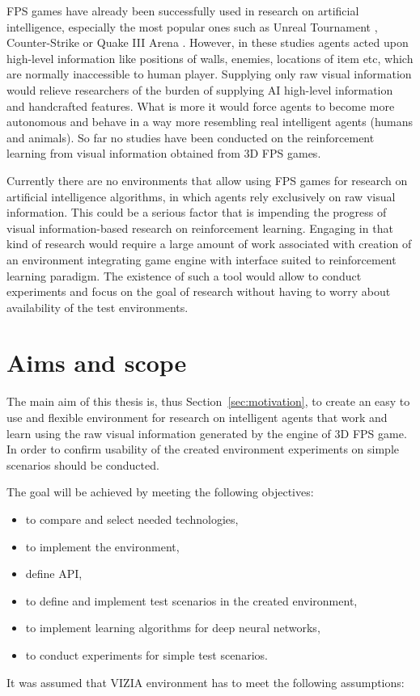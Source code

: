 FPS games have already been successfully used in research on artificial intelligence, especially the most popular ones such as Unreal Tournament \cite{6314567} \cite{6922494}, Counter-Strike \cite{5035619} or Quake III Arena \cite{el2007hybrid}.
However, in these studies agents acted upon high-level information like positions of walls, enemies, locations of item etc, which are normally inaccessible to human player.
Supplying only raw visual information would relieve researchers of the burden of supplying AI high-level information and handcrafted features.
What is more it would force agents to become more autonomous and behave in a way more resembling real intelligent agents (humans and animals).
So far no studies have been conducted on the reinforcement learning from visual information obtained from 3D FPS games.


Currently there are no environments that allow using FPS games for research on artificial intelligence algorithms, in which agents rely exclusively on raw visual information.
This could be a serious factor that is impending the progress of visual information-based research on reinforcement learning.
Engaging in that kind of research would require a large amount of work associated with creation of an environment integrating game engine with interface suited to reinforcement learning paradigm.
The existence of such a tool would allow to conduct experiments and focus on the goal of research without having to worry about availability of the test environments.
 

\section{Aims and scope}
The main aim of this thesis is, thus Section~\ref{sec:motivation}, to create an easy to use and flexible environment for research on intelligent agents that work and learn using the raw visual information generated by the engine of 3D FPS game. 
In order to confirm usability of the created environment experiments on simple scenarios should be conducted.

The goal will be achieved by meeting the following objectives:
\begin{itemize}
 \item to compare and select needed technologies,
 \item to implement the environment,
 \item define API,
 \item to define and implement test scenarios in the created environment,
 \item to implement learning algorithms for deep neural networks,
 \item to conduct experiments for simple test scenarios.
\end{itemize}
It was assumed that VIZIA environment has to meet the following assumptions:


